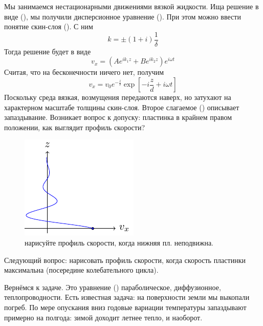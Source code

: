 Мы занимаемся нестационарными движениями вязкой жидкости.
Ища решение в виде (), мы получили дисперсионное уравнение (). 
При этом можно ввести понятие скин-слоя (). С ним
\begin{equation}
    k=\pm (1+i) \frac{1}{\delta}
\end{equation}
Тогда решение будет в виде
\begin{equation}
    v_x=(Ae^{ik_1 z}+Be^{ik_2 z})e^{i\omega t}
\end{equation}
Считая, что на бесконечности ничего нет, получим
\begin{equation}
    v_x=v_0 e^{-\frac{z}{\delta}} \exp[-i \frac{z}{d}+ i\omega t]
\end{equation}
Поскольку среда вязкая, возмущения передаются наверх, но затухают на характерном масштабе толщины скин-слоя. Второе слагаемое () описывает запаздывание. Возникает вопрос к допуску: пластинка в крайнем правом положении, как выглядит профиль скорости?
\begin{figure}[tb]
    \centering
    \includegraphics[scale=1.5]{img/krai}
    \caption{нарисуйте профиль скорости, когда нижняя пл. неподвижна.}
    \label{fig:figure1}
\end{figure}
Следующий вопрос: нарисовать профиль скорости, когда скорость пластинки максимальна (посередине колебательного цикла).  

Вернёмся к задаче. 
Это уравнение () параболическое, диффузионное, теплопроводности. 
Есть известная задача: на поверхности земли мы выкопали погреб. 
По мере опускания вниз годовые вариации температуры запаздывают примерно на полгода: зимой доходит летнее тепло, и наоборот.



